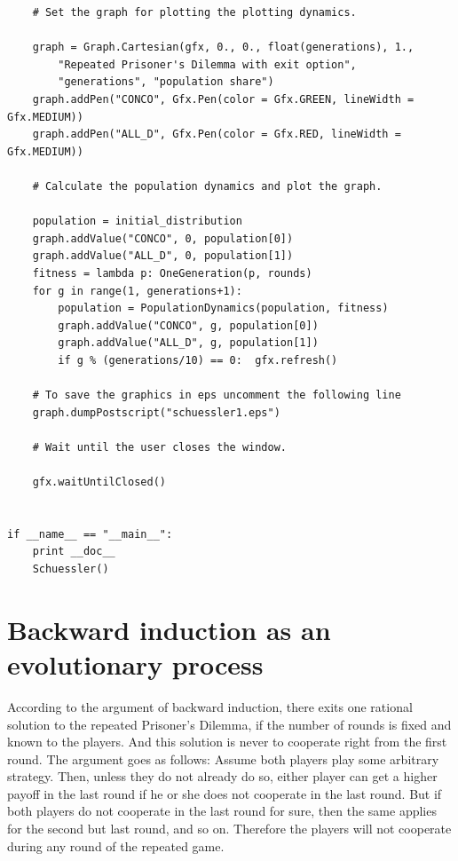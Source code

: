 \begin{scriptsize}
\begin{verbatim}
    # Set the graph for plotting the plotting dynamics.

    graph = Graph.Cartesian(gfx, 0., 0., float(generations), 1.,
        "Repeated Prisoner's Dilemma with exit option",
        "generations", "population share")
    graph.addPen("CONCO", Gfx.Pen(color = Gfx.GREEN, lineWidth = Gfx.MEDIUM))
    graph.addPen("ALL_D", Gfx.Pen(color = Gfx.RED, lineWidth = Gfx.MEDIUM))

    # Calculate the population dynamics and plot the graph.

    population = initial_distribution
    graph.addValue("CONCO", 0, population[0])
    graph.addValue("ALL_D", 0, population[1])
    fitness = lambda p: OneGeneration(p, rounds)
    for g in range(1, generations+1):
        population = PopulationDynamics(population, fitness)
        graph.addValue("CONCO", g, population[0])
        graph.addValue("ALL_D", g, population[1])         
        if g % (generations/10) == 0:  gfx.refresh()

    # To save the graphics in eps uncomment the following line
    graph.dumpPostscript("schuessler1.eps")

    # Wait until the user closes the window.

    gfx.waitUntilClosed()
    

if __name__ == "__main__":
    print __doc__
    Schuessler()

\end{verbatim}
\end{scriptsize}

\newpage

\section{Backward induction as an evolutionary process }
\label{backwardInduction}

According to the argument of backward induction, there exits one rational
solution to the repeated Prisoner's Dilemma, if the number of rounds is fixed
and known to the players. And this solution is never to cooperate right from
the first round. The argument goes as follows: Assume both players play some
arbitrary strategy. Then, unless they do not already do so, either player can
get a higher payoff in the last round if he or she does not cooperate in the
last round. But if both players do not cooperate in the last round for sure,
then the same applies for the second but last round, and so on. Therefore the
players will not cooperate during any round of the repeated game.


